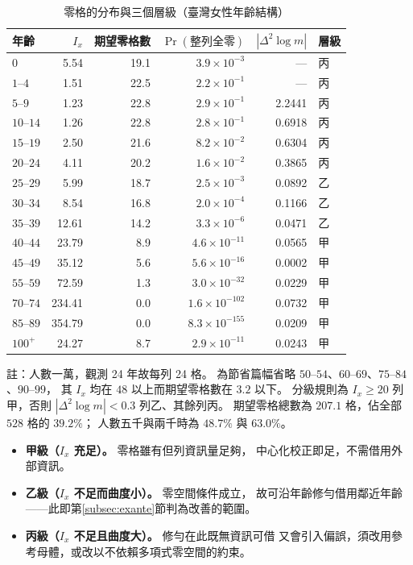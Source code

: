 \documentclass[UTF8, fontset=macnew, a4paper, 12pt]{ctexart}
\begin{document}
\begin{table}[H]
\centering
\caption{零格的分布與三個層級（臺灣女性年齡結構）}
\small
\renewcommand{\arraystretch}{1.05}
\begin{tabular}{lrrrrl}
\toprule
年齡 & $I_x$ & 期望零格數 & $\Pr(\text{整列全零})$ & $|\Delta^2\log m|$ & 層級\\
\midrule
0          & 5.54 & 19.1 & $3.9\times10^{-3}$ & — & 丙\\
$1$--$4$   & 1.51 & 22.5 & $2.2\times10^{-1}$ & — & 丙\\
$5$--$9$   & 1.23 & 22.8 & $2.9\times10^{-1}$ & 2.2441 & 丙\\
$10$--$14$ & 1.26 & 22.8 & $2.8\times10^{-1}$ & 0.6918 & 丙\\
$15$--$19$ & 2.50 & 21.6 & $8.2\times10^{-2}$ & 0.6304 & 丙\\
$20$--$24$ & 4.11 & 20.2 & $1.6\times10^{-2}$ & 0.3865 & 丙\\
$25$--$29$ & 5.99 & 18.7 & $2.5\times10^{-3}$ & 0.0892 & 乙\\
$30$--$34$ & 8.54 & 16.8 & $2.0\times10^{-4}$ & 0.1166 & 乙\\
$35$--$39$ & 12.61 & 14.2 & $3.3\times10^{-6}$ & 0.0471 & 乙\\
$40$--$44$ & 23.79 & 8.9 & $4.6\times10^{-11}$ & 0.0565 & 甲\\
$45$--$49$ & 35.12 & 5.6 & $5.6\times10^{-16}$ & 0.0002 & 甲\\
$55$--$59$ & 72.59 & 1.3 & $3.0\times10^{-32}$ & 0.0229 & 甲\\
$70$--$74$ & 234.41 & 0.0 & $1.6\times10^{-102}$ & 0.0732 & 甲\\
$85$--$89$ & 354.79 & 0.0 & $8.3\times10^{-155}$ & 0.0209 & 甲\\
$100^{+}$  & 24.27 & 8.7 & $2.9\times10^{-11}$ & 0.0243 & 甲\\
\bottomrule
\end{tabular}

\vspace{2pt}
\parbox{0.92\textwidth}{\footnotesize 註：人數一萬，觀測 24 年故每列 24 格。
為節省篇幅省略 $50$--$54$、$60$--$69$、$75$--$84$、$90$--$99$，
其 $I_x$ 均在 $48$ 以上而期望零格數在 $3.2$ 以下。
分級規則為 $I_x\ge20$ 列甲，否則 $|\Delta^2\log m|<0.3$ 列乙、其餘列丙。
期望零格總數為 $207.1$ 格，佔全部 $528$ 格的 $39.2\%$；
人數五千與兩千時為 $48.7\%$ 與 $63.0\%$。}
\label{tab:tiers}
\end{table}

\begin{itemize}
\item \textbf{甲級（$I_x$ 充足）。} 零格雖有但列資訊量足夠，
中心化校正即足，不需借用外部資訊。
\item \textbf{乙級（$I_x$ 不足而曲度小）。} 零空間條件成立，
故可沿年齡修勻借用鄰近年齡——此即第\ref{subsec:exante}節判為改善的範圍。
\item \textbf{丙級（$I_x$ 不足且曲度大）。} 修勻在此既無資訊可借
又會引入偏誤，須改用參考母體，或改以不依賴多項式零空間的約束。
\end{itemize}
\end{document}
